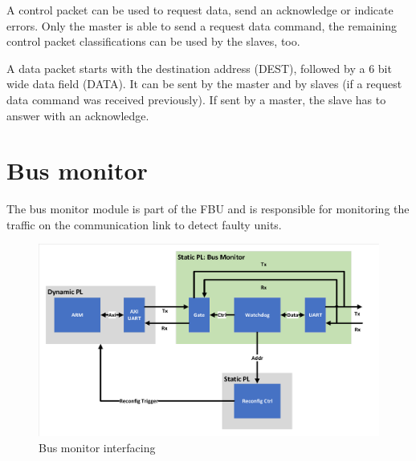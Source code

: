 A control packet can be used to request data, send an acknowledge or indicate errors. Only the master is able to send a request data command, the remaining control packet classifications can be used by the slaves, too.

A data packet starts with the destination address (DEST), followed by a 6 bit wide data field (DATA). It can be sent by the master and by slaves (if a request data command was received previously). If sent by a master, the slave has to answer with an acknowledge.

\section{Bus monitor}

The bus monitor module is part of the \gls{FBU} and is responsible for monitoring the traffic on the communication link to detect faulty units.

\begin{figure}[h!]
    \centering
    \includegraphics[width=\textwidth]{figures/BusMonitor.pdf}
    \caption{Bus monitor interfacing}\label{fig:BusMonitor}
\end{figure}
